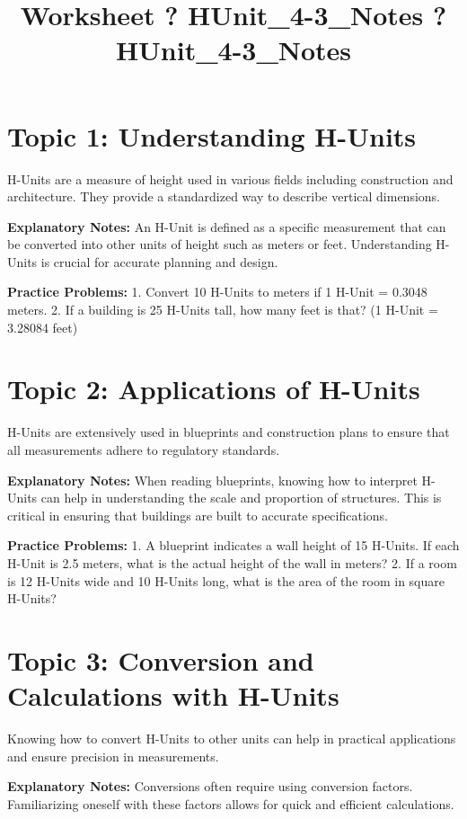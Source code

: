 \documentclass{article}
\title{Worksheet ? HUnit_4-3_Notes ? HUnit_4-3_Notes}
\author{}
\date{}
\begin{document}
\maketitle

\section*{Topic 1: Understanding H-Units}
H-Units are a measure of height used in various fields including construction and architecture. They provide a standardized way to describe vertical dimensions.

\textbf{Explanatory Notes:}  
An H-Unit is defined as a specific measurement that can be converted into other units of height such as meters or feet. Understanding H-Units is crucial for accurate planning and design.

\textbf{Practice Problems:}  
1. Convert 10 H-Units to meters if 1 H-Unit = 0.3048 meters.  
2. If a building is 25 H-Units tall, how many feet is that? (1 H-Unit = 3.28084 feet)

\section*{Topic 2: Applications of H-Units}
H-Units are extensively used in blueprints and construction plans to ensure that all measurements adhere to regulatory standards.

\textbf{Explanatory Notes:}  
When reading blueprints, knowing how to interpret H-Units can help in understanding the scale and proportion of structures. This is critical in ensuring that buildings are built to accurate specifications.

\textbf{Practice Problems:}  
1. A blueprint indicates a wall height of 15 H-Units. If each H-Unit is 2.5 meters, what is the actual height of the wall in meters?  
2. If a room is 12 H-Units wide and 10 H-Units long, what is the area of the room in square H-Units?

\section*{Topic 3: Conversion and Calculations with H-Units}
Knowing how to convert H-Units to other units can help in practical applications and ensure precision in measurements.

\textbf{Explanatory Notes:}  
Conversions often require using conversion factors. Familiarizing oneself with these factors allows for quick and efficient calculations.
\end{document}
